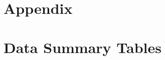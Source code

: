 \documentclass[10pt,letterpaper]{article}
\begin{document}






\clearpage



\clearpage
\section*{Appendix}
\appendix
\section{Data Summary Tables}\label{sec:data summary}
\end{document}
